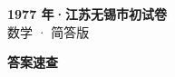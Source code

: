 \documentclass[zihao=-4, a4paper]{ctexart}
\begin{document}
\begin{center}
  {\Large\bfseries 1977 年·江苏无锡市初试卷}\\[4pt]
  {\large 数学 · 简答版}
\end{center}
\medskip
{}

\clearpage
{}
\begin{center}{\Large\bfseries 答案速查}\end{center}
\medskip

\end{document}
